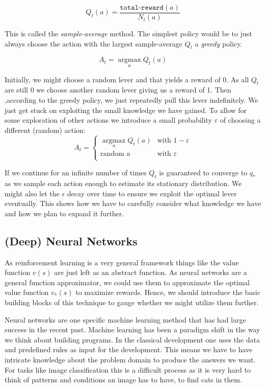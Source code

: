 $$
    Q_t(a) = \frac{\texttt{total-reward}(a)}{N_t(a)}
$$

This is called the \textit{sample-average} method. The simplest policy would be to just always choose the action with the largest sample-average $ Q_t $ a \textit{greedy} policy.

$$
    A_t = \operatorname*{argmax}_a Q_t(a)
$$

Initially, we might choose a random lever and that yields a reward of 0. As all $ Q_t $ are still 0 we choose another random lever giving us a reward of 1. Then ,according to the greedy policy, we just repeatedly pull this lever indefinitely. We just get stuck on exploiting the small knowledge we have gained. To allow for some exploration of other actions we introduce a small probability $\varepsilon $ of choosing a different (random) action:
$$
    A_t =
    \begin{cases}
        \operatorname*{argmax}_a Q_t(a) & \text{with } 1 - \varepsilon \\
        \text{random } a                & \text{with }  \varepsilon    \\
    \end{cases}
$$

If we continue for an infinite number of times $ Q_t $ is guaranteed to converge to $ q_{*} $ as we sample each action enough to estimate its stationary distribution. We might also let the $ \epsilon $ decay over time to ensure we exploit the optimal lever eventually. This shows how we have to carefully consider what knowledge we have and how we plan to expand it further.

\subsection{(Deep) Neural Networks}
\label{neural_networks}
As reinforcement learning is a very general framework things like the value function $ v(s)$ are just left as an abstract function. As neural networks are a general function approximator, we could use them to approximate the optimal value function $ v_{*}(s) $ to maximize rewards. Hence, we should introduce the basic building blocks of this technique to gauge whether we might utilize them further.

Neural networks are one specific machine learning method that has had large success in the recent past. Machine learning has been a paradigm shift in the way we think about building programs. In the classical development one uses the data and predefined rules as input for the development. This means we have to have intricate knowledge about the problem domain to produce the answers we want. For tasks like image classification this is a difficult process as it is very hard to think of patterns and conditions an image has to have, to find cats in them.

